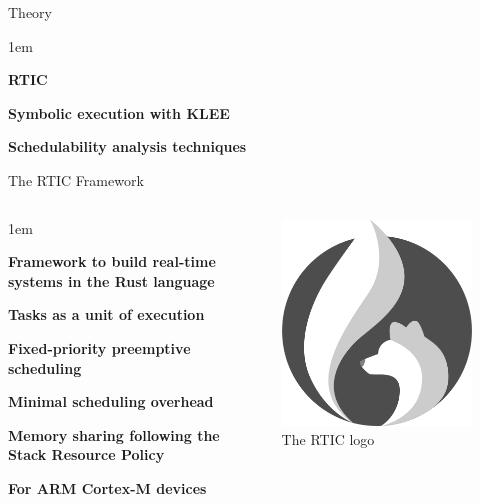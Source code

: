 \begin{frame}{Theory}
    \begin{itemize-size}{1em}
        \item \textbf{RTIC}
        \item \textbf{Symbolic execution with KLEE}
        \item \textbf{Schedulability analysis techniques}
    \end{itemize-size}
\end{frame}

\begin{frame}{The RTIC Framework}
    \begin{columns}
        \begin{itemize-size}{1em}
            \item \textbf{Framework to build real-time systems in the Rust language}
            \item \textbf{Tasks as a unit of execution}
            \item \textbf{Fixed-priority preemptive scheduling}
            \item \textbf{Minimal scheduling overhead}
            \item \textbf{Memory sharing following the Stack Resource Policy}
            \item \textbf{For ARM Cortex-M devices}
        \end{itemize-size}

        \begin{figure}
            \centering
            \includegraphics[scale=0.35]{pictures/RTIC.png}
            \caption{The RTIC logo}
        \end{figure}
    \end{columns}
\end{frame}


